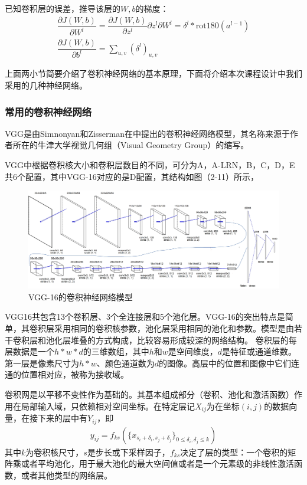 \documentclass[supercite]{HustGraduPaper}
\begin{document}
\begin{sloppypar}
  {\heiti 已知卷积层的误差，推导该层的$W,b$的梯度：}\begin{gather}
    \dfrac{\partial J(W,b)}{\partial W^l}=\dfrac{\partial J(W,b)}{\partial z^l}{\partial z^l}{\partial W^l}=\delta^l*\text{rot180}(a^{l-1})\\
    \dfrac{\partial J(W,b)}{\partial b^l}=\sum\limits_{u,v}(\delta^l)_{u,v}
  \end{gather}

  上面两小节简要介绍了卷积神经网络的基本原理，下面将介绍本次课程设计中我们采用的几种神经网络。
  \subsubsection{常用的卷积神经网络}
  VGG是由Simnonyan和Zisserman在\cite{DBLP:journals/corr/SimonyanZ14a}中提出的卷积神经网络模型，其名称来源于作者所在的牛津大学视觉几何组（Visual Geometry Group）的缩写。

  VGG中根据卷积核大小和卷积层数目的不同，可分为A，A-LRN，B，C，D，E共6个配置，其中VGG-16对应的是D配置，其结构如图（2-11）所示，\begin{figure}[H]
    \setlength{\abovecaptionskip}{0.2cm}
    \setlength{\belowcaptionskip}{-0.cm}
      \centering%
      \includegraphics[scale=0.3]{14.jpg}
      \caption{VGG-16的卷积神经网络模型}
    \end{figure}
  
    VGG16共包含13个卷积层、3个全连接层和5个池化层。VGG-16的突出特点是简单，其卷积层采用相同的卷积核参数，池化层采用相同的池化和参数。模型是由若干卷积层和池化层堆叠的方式构成，比较容易形成较深的网络结构。
   卷积层的每层数据是一个$h*w*d$的三维数组，其中$h$和$w$是空间维度，$d$是特征或通道维数。第一层是像素尺寸为$h*w$、颜色通道数为$d$的图像。高层中的位置和图像中它们连通的位置相对应，被称为接收域。

   卷积网是以平移不变性作为基础的。其基本组成部分（卷积、池化和激活函数）作用在局部输入域，只依赖相对空间坐标。在特定层记$X_{ij}$为在坐标$(i,j)$的数据向量，在接下来的层中有$Y_{ij}$，即\begin{gather}
     y_{ij}=f_{ks}(\{ x_{s_i+\delta_i,s_j+\delta_j} \}_{0\leq\delta_i,\delta_j\leq k})
   \end{gather}
  其中$k$为卷积核尺寸，$s$是步长或下采样因子，$f_{ks}$决定了层的类型：一个卷积的矩阵乘或者平均池化，用于最大池化的最大空间值或者是一个元素级的非线性激活函数，或者其他类型的网络层。
  

\end{sloppypar}
\end{document}

